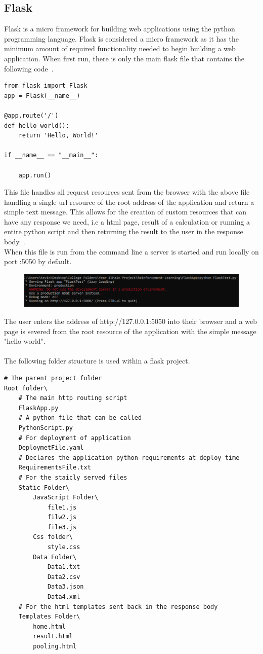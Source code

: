 \subsection{Flask}
Flask is a micro framework for building  web applications using the python programming language. Flask is considered a micro framework as it has the minimum amount of required functionality needed to begin building a web application. When first run, there is only the main flask file that contains the following code~\cite{Welcomet92:online}.
\begin{verbatim}
from flask import Flask
app = Flask(__name__)

@app.route('/')
def hello_world():
	return 'Hello, World!'

if __name__ == "__main__":

	app.run()
\end{verbatim}
This file handles all request resources sent from the browser with the above file handling a single url resource of the root address of the application and return a simple text message. This allows for the creation of custom resources that can have any response we need, i.e a html page, result of a calculation or running a entire python script and then returning the result to the user in the response body~\cite{Welcomet92:online}.\\
When this file is run from the command line a server is started and run locally on port :5050 by default.
\begin{figure}[H]
	\centering
	\includegraphics[width=1\linewidth]{img/flaskCmd}
	\caption{}
	\label{fig:flaskcmd}
\end{figure}
The user enters the address of http://127.0.0.1:5050 into their browser and a web page is severed from the root resource of the application with the simple message "hello world".\\\\
The following folder structure is used within a flask project.
\begin{verbatim}
# The parent project folder
Root folder\
	# The main http routing script
	FlaskApp.py 
	# A python file that can be called
	PythonScript.py 
	# For deployment of application
	DeploymetFile.yaml
	# Declares the application python requirements at deploy time 
	RequirementsFile.txt 
	# For the staicly served files
	Static Folder\
		JavaScript Folder\
			file1.js
			filw2.js
			file3.js
		Css folder\
			style.css
		Data Folder\
			Data1.txt
			Data2.csv
			Data3.json
			Data4.xml
	# For the html templates sent back in the response body
	Templates Folder\
		home.html
		result.html
		pooling.html
\end{verbatim}

